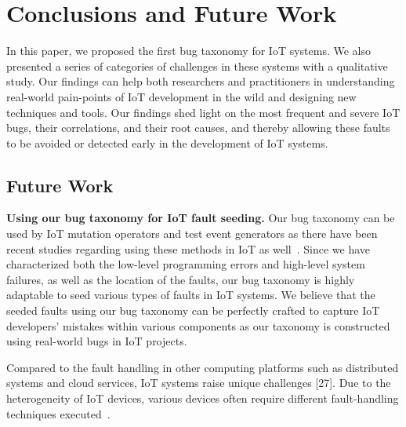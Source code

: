
\chapter{Conclusions and Future Work}
\label{ch:conclusion}

In this paper, we proposed the first bug taxonomy for IoT systems. We also presented a series of categories of challenges in these systems with a qualitative study. Our findings can help both researchers and practitioners in understanding real-world pain-points of IoT development in the wild and designing new techniques and tools. Our findings shed light on the most frequent and severe IoT bugs, their correlations, and their root causes, and thereby allowing these faults to be avoided or detected early in the development of IoT systems. 

\section{Future Work}
 \textbf{Using our bug taxonomy for IoT fault seeding.}
Our bug taxonomy can be used by IoT mutation operators and test event generators as there have been recent studies regarding using these methods in IoT as well~\cite{gutierrez2019evolutionary,gutierrez2018iot}. Since we have characterized both the low-level programming errors and high-level system failures, as well as the location of the faults, our bug taxonomy is highly adaptable to seed various types of faults in IoT systems. We believe that the seeded faults using our bug taxonomy can be perfectly crafted to capture IoT developers' mistakes within various components as our taxonomy is constructed using real-world bugs in IoT projects.

Compared to the fault handling in other computing platforms such as distributed systems and cloud services, IoT systems raise unique challenges [27]. Due to the heterogeneity of IoT devices, various devices often require different fault-handling techniques executed~\cite{norris2020iotrepair}.





\endinput


